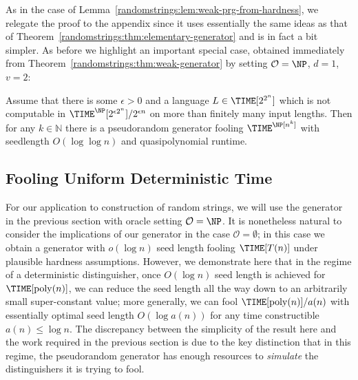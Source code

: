As in the case of Lemma~\ref{randomstrings:lem:weak-prg-from-hardness}, we relegate the proof to the appendix since it uses essentially the same ideas as that of Theorem~\ref{randomstrings:thm:elementary-generator} and is in fact a bit simpler. As before we highlight an important special case, obtained immediately from Theorem~\ref{randomstrings:thm:weak-generator} by setting $\mathcal{O}= \NP$, $d=1$, $v = 2$:

\begin{theorem}\label{randomstrings:thm:weak-loglog-gen}
Assume that there is some $\epsilon > 0$ and a language $L \in \TIME[2^{2^n}]$ which is not computable in $\TIME^\NP[2^{\epsilon 2^n}]/2^{\epsilon n}$ on more than finitely many input lengths. Then for any $k \in \mathbb{N}$ there is a pseudorandom generator fooling $\TIME^\NP[n^k]$ with seedlength $O(\log \log n)$ and quasipolynomial runtime.
\end{theorem}

\subsection{Fooling Uniform Deterministic Time }\label{randomstrings:subsec:deterministic}

For our application to construction of random strings, we will use the generator in the previous section with oracle setting $\mathcal{O} = \NP$. It is nonetheless natural to consider the implications of our generator in the case $\mathcal{O} = \emptyset$; in this case we obtain a generator with $o(\log n)$ seed length fooling $\TIME[T(n)]$ under plausible hardness assumptions. However, we demonstrate here that in the regime of a deterministic distinguisher, once $O(\log n)$ seed length is achieved for $\TIME[\poly(n)]$, we can reduce the seed length all the way down to an arbitrarily small super-constant value; more generally, we can fool $\TIME[\poly(n)]/a(n)$ with essentially optimal seed length $O(\log a(n))$ for any time constructible $a(n) \leq \log n$. 
The discrepancy between the simplicity of the result here and the work required in the previous section is due to the key distinction that in this regime, the pseudorandom generator has enough resources to \emph{simulate} the distinguishers it is trying to fool.

